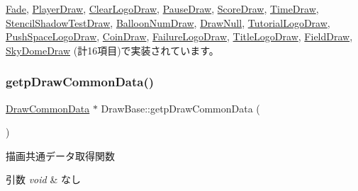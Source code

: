 \mbox{\hyperlink{class_fade_ab971b8bb17f81d73e0405291a6512a39}{Fade}}, \mbox{\hyperlink{class_player_draw_a3abcf6fb159e94ca4e5785b572e0af11}{Player\+Draw}}, \mbox{\hyperlink{class_clear_logo_draw_adbf4078e91bef05bf5a366adcda744a3}{Clear\+Logo\+Draw}}, \mbox{\hyperlink{class_pause_draw_a191f46de3bb829ab30fca52f902c1df9}{Pause\+Draw}}, \mbox{\hyperlink{class_score_draw_a8736a0044e8a2a6258c396bfed4d1ce8}{Score\+Draw}}, \mbox{\hyperlink{class_time_draw_ac844c99a6d5cdcad9c541779a0e99b22}{Time\+Draw}}, \mbox{\hyperlink{class_stencil_shadow_test_draw_a5c74550a8e0eccf29f3c93e5027e492e}{Stencil\+Shadow\+Test\+Draw}}, \mbox{\hyperlink{class_balloon_num_draw_a1bf5721e82b99cdfd5550262f560da95}{Balloon\+Num\+Draw}}, \mbox{\hyperlink{class_draw_null_a98cc7cd43b19d9d70cc621d23d89286f}{Draw\+Null}}, \mbox{\hyperlink{class_tutorial_logo_draw_a80a3858068af2dcbd1ffc7e59c212924}{Tutorial\+Logo\+Draw}}, \mbox{\hyperlink{class_push_space_logo_draw_a0b4de9ad688997090ab6ab4925e1f5d8}{Push\+Space\+Logo\+Draw}}, \mbox{\hyperlink{class_coin_draw_a38a4143f2e93a5b16d33ec94a188f4f6}{Coin\+Draw}}, \mbox{\hyperlink{class_failure_logo_draw_a3247b4c8de4cb8a8af0ca9dfaf85018b}{Failure\+Logo\+Draw}}, \mbox{\hyperlink{class_title_logo_draw_a4e3da42496afc69f31731e8abfb27380}{Title\+Logo\+Draw}}, \mbox{\hyperlink{class_field_draw_a8e4ea02d9efb9895a0172c29a91d0fb2}{Field\+Draw}}, \mbox{\hyperlink{class_sky_dome_draw_aaa9db229fadd7d4c041afa5436a584af}{Sky\+Dome\+Draw}} (計16項目)で実装されています。

\mbox{\label{class_draw_base_ac55a0cbcb51067ec9a3515530bb3f7de}} 
\subsubsection{\texorpdfstring{getp\+Draw\+Common\+Data()}{getpDrawCommonData()}}
{\footnotesize\ttfamily \mbox{\hyperlink{class_draw_common_data}{Draw\+Common\+Data}} $\ast$ Draw\+Base\+::getp\+Draw\+Common\+Data (\begin{DoxyParamCaption}{ }\end{DoxyParamCaption})}



描画共通データ取得関数 


\begin{DoxyParams}{引数}
{\em void} & なし \\
\hline
\end{DoxyParams}

